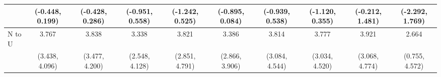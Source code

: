 {\begin{tabular}{l|c|c|c|c|c|c|c|c|c}
& {\scriptsize (-0.448, 0.199)}
& {\scriptsize (-0.428, 0.286)}
& {\scriptsize (-0.951, 0.558)}
& {\scriptsize (-1.242, 0.525)}
& {\scriptsize (-0.895, 0.084)}
& {\scriptsize (-0.939, 0.538)}
& {\scriptsize (-1.120, 0.355)}
& {\scriptsize (-0.212, 1.481)}
& {\scriptsize (-2.292, 1.769)}
\\ [0.1cm]
\hline
N to U
& 3.767 & 3.838 & 3.338 & 3.821 & 3.386 & 3.814 & 3.777 & 3.921 & 2.664 \\
& {\scriptsize (3.438, 4.096)}
& {\scriptsize (3.477, 4.200)}
& {\scriptsize (2.548, 4.128)}
& {\scriptsize (2.851, 4.791)}
& {\scriptsize (2.866, 3.906)}
& {\scriptsize (3.084, 4.544)}
& {\scriptsize (3.034, 4.520)}
& {\scriptsize (3.068, 4.774)}
& {\scriptsize (0.755, 4.572)}
\\ [0.1cm]
\hline
\hline
\end{tabular}
}
